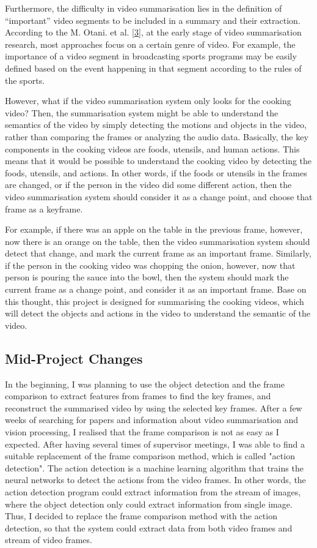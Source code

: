 \documentclass{article}
\begin{document}
Furthermore, the difficulty in video summarisation lies in the definition of “important” video segments to be included in a summary and their extraction. According to the M. Otani. et al. \hyperlink{ref3}{[3]}, at the early stage of video summarisation research, most approaches focus on a certain genre of video. For example, the importance of a video segment in broadcasting sports programs may be easily defined based on the event happening in that segment according to the rules of the sports.

However, what if the video summarisation system only looks for the cooking video? Then, the summarisation system might be able to understand the semantics of the video by simply detecting the motions and objects in the video, rather than comparing the frames or analyzing the audio data. Basically, the key components in the cooking videos are foods, utensils, and human actions. This means that it would be possible to understand the cooking video by detecting the foods, utensils, and actions. In other words, if the foods or utensils in the frames are changed, or if the person in the video did some different action, then the video summarisation system should consider it as a change point, and choose that frame as a keyframe.

For example, if there was an apple on the table in the previous frame, however, now there is an orange on the table, then the video summarisation system should detect that change, and mark the current frame as an important frame. Similarly, if the person in the cooking video was chopping the onion, however, now that person is pouring the sauce into the bowl, then the system should mark the current frame as a change point, and consider it as an important frame. Base on this thought, this project is designed for summarising the cooking videos, which will detect the objects and actions in the video to understand the semantic of the video.

\subsection{Mid-Project Changes}

In the beginning, I was planning to use the object detection and the frame comparison to extract features from frames to find the key frames, and reconstruct the summarised video by using the selected key frames. After a few weeks of searching for papers and information about video summarisation and vision processing, I realised that the frame comparison is not as easy as I expected. After having several times of supervisor meetings, I was able to find a suitable replacement of the frame comparison method, which is called "action detection". The action detection is a machine learning algorithm that trains the neural networks to detect the actions from the video frames. In other words, the action detection program could extract information from the stream of images, where the object detection only could extract information from single image. Thus, I decided to replace the frame comparison method with the action detection, so that the system could extract data from both video frames and stream of video frames.
\end{document}
